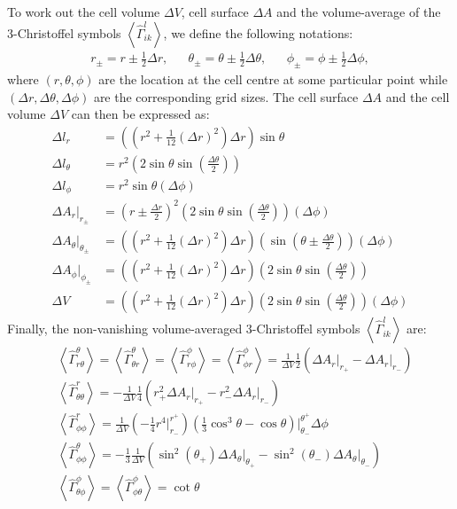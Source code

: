 To work out the cell volume $\Delta V$, cell surface $\Delta A$ and the volume-average of the 3-Christoffel symbols $\left< \hat{\Gamma}^l_{ik}\right>$, we define the following notations: 
\begin{align}
&r_\pm = r \pm \frac{1}{2}\Delta r ,&
&\theta_\pm = \theta \pm \frac{1}{2}\Delta \theta ,&
&\phi_\pm = \phi \pm \frac{1}{2}\Delta \phi ,&
\end{align}
where $(r,\theta,\phi)$ are the location at the cell centre at some particular point while $(\Delta r,\Delta \theta,\Delta \phi)$ are the corresponding grid sizes.
The cell surface $\Delta A$ and the cell volume $\Delta V$ can then be expressed as:
\begin{align}
\Delta l_r &=  \left( \left(r^2 + \frac{1}{12}\left(\Delta r\right)^2\right)\Delta r \right) \sin \theta \\
\Delta l_\theta &= r^2 \left( 2 \sin \theta \sin\left(\frac{\Delta \theta}{2}\right) \right) \\
\Delta l_\phi &= r^2 \sin\theta  \left( \Delta \phi \right) \\
\Delta A_r\Big|_{r_\pm} &= \left( r \pm \frac{\Delta r}{2} \right)^2 \left( 2 \sin \theta \sin\left(\frac{\Delta \theta}{2}\right) \right) \left( \Delta \phi \right) \\
\Delta A_\theta \Big|_{\theta_\pm} &=  \left( \left(r^2 + \frac{1}{12}\left(\Delta r\right)^2\right)\Delta r \right) \left( \sin \left( \theta \pm \frac{\Delta \theta}{2} \right) \right) \left( \Delta \phi \right) \\
\Delta A_\phi \Big|_{\phi_\pm} &=  \left( \left(r^2 + \frac{1}{12}\left(\Delta r\right)^2\right)\Delta r \right) \left( 2 \sin \theta \sin\left(\frac{\Delta \theta}{2}\right) \right)\\
\Delta V &= \left( \left(r^2 + \frac{1}{12}\left(\Delta r\right)^2\right)\Delta r \right) \left( 2 \sin \theta \sin\left(\frac{\Delta \theta}{2}\right) \right) \left( \Delta \phi \right)
\end{align}
Finally, the non-vanishing volume-averaged 3-Christoffel symbols $\left< \hat{\Gamma}^l_{ik}\right>$ are:
\begin{align}
&\left<\hat{\Gamma}^{\theta}_{r \theta} \right> = \left<\hat{\Gamma}^{\theta}_{ \theta r} \right>  = \left<\hat{\Gamma}^{\phi}_{r \phi} \right> = \left<\hat{\Gamma}^{\phi}_{\phi r} \right>
 = \frac{1}{\Delta V} \frac{1}{2} \left( \Delta A_r\Big|_{r_+} - \Delta A_r\Big|_{r_-} \right) \\
&\left<\hat{\Gamma}^{r}_{\theta \theta} \right> =  -\frac{1}{\Delta V} \frac{1}{4} \left( r_+^2\Delta A_r\Big|_{r_+} - r_-^2\Delta A_r\Big|_{r_-} \right) \\
&\left<\hat{\Gamma}^{r}_{\phi \phi} \right> = \frac{1}{\Delta V} \left( -\frac{1}{4} r^4 \Big|_{r_-}^{r^+} \right) \left(\frac{1}{3}\cos^3\theta - \cos\theta\right)\Big|_{\theta_-}^{\theta^+} \Delta \phi \\
&\left<\hat{\Gamma}^{\theta}_{\phi \phi} \right> = - \frac{1}{3} \frac{1}{\Delta V} \left( \sin^2 (\theta_+) \Delta A_\theta\Big|_{\theta_+} - \sin^2 (\theta_-) \Delta A_\theta \Big|_{\theta_-} \right) \\
&\left<\hat{\Gamma}^{\phi}_{\theta \phi} \right> = \left<\hat{\Gamma}^{\phi}_{\phi \theta } \right> = \cot \theta
\end{align}
